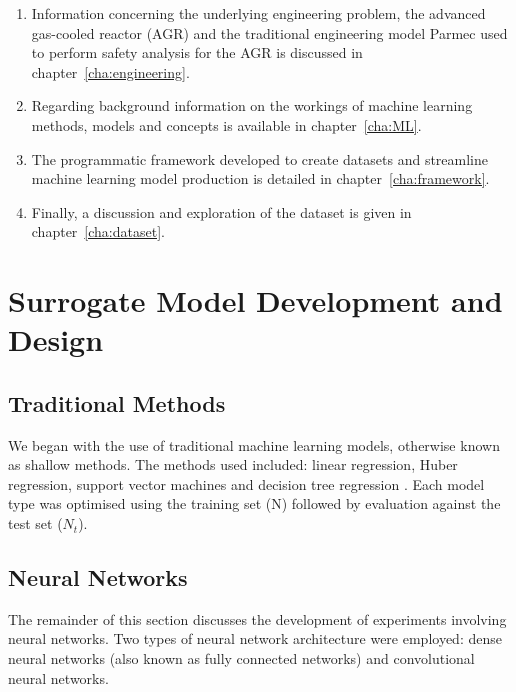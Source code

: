 \begin{enumerate}
	
	\item Information concerning the underlying engineering problem, the advanced gas-cooled reactor (AGR) and the traditional engineering model Parmec used to perform safety analysis for the AGR is discussed in chapter~\ref{cha:engineering}.
	
	\item Regarding background information on the workings of machine learning methods, models and concepts is available in chapter~\ref{cha:ML}.
	
	\item The programmatic framework developed to create datasets and streamline machine learning model production is detailed in chapter~\ref{cha:framework}.
	
	\item Finally, a discussion and exploration of the dataset is given in chapter~\ref{cha:dataset}.
	
\end{enumerate}

\section{Surrogate Model Development and Design} \label{method}

\subsection{Traditional Methods} \label{traditional}

We began with the use of traditional machine learning models, otherwise known as shallow methods. The methods used included: linear regression, Huber regression, support vector machines \cite{smola2004tutorial} and decision tree regression \cite{navada2011overview}. Each model type was optimised using the training set (N) followed by evaluation against the test set ($N_t$). 

\subsection{Neural Networks}

The remainder of this section discusses the development of experiments involving neural networks. Two types of neural network architecture were employed: dense neural networks (also known as fully connected networks) and convolutional neural networks.
\\

